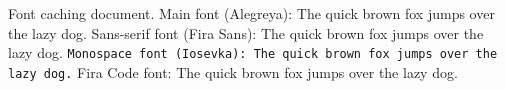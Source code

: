 \documentclass{article}
\begin{document}
Font caching document. Main font (Alegreya): The quick brown fox jumps over the lazy dog. \textsf{Sans-serif font (Fira Sans): The quick brown fox jumps over the lazy dog.} \texttt{Monospace font (Iosevka): The quick brown fox jumps over the lazy dog.} {\firacode Fira Code font: The quick brown fox jumps over the lazy dog.}
\end{document}

